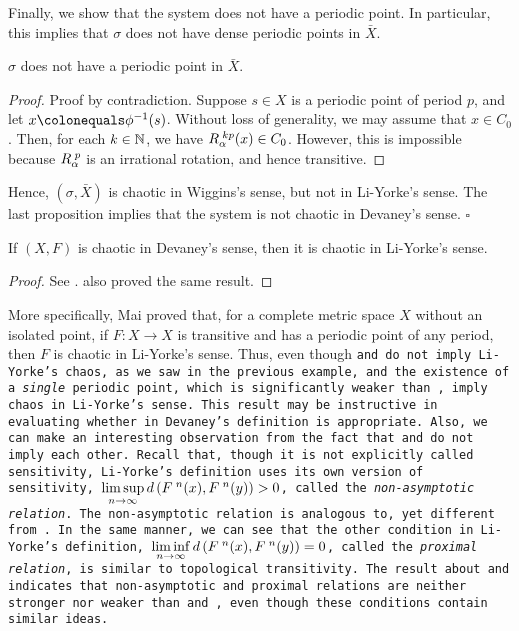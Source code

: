\documentclass[10pt,twoside,draft]{book}
\begin{document}
\begin{example}
  Finally, we show that the system does not have a periodic point.
  In particular, this implies that $\sigma$ does not have dense periodic points in $\bar{X}$.
  \begin{proposition}
    $\sigma$ does not have a periodic point in $\bar{X}$.
    \begin{proof}
      Proof by contradiction.
      Suppose $s \in X$ is a periodic point of period $p$, and let $x \ceq \phi^{-1}(s)$. 
      Without loss of generality, we may assume that $x \in C_0$.
      Then, for each $k \in \mathbb{N}$, we have $R_\alpha^{\;kp}(x) \in C_0$.
      However, this is impossible because $R_\alpha^{\;p}$ is an irrational rotation, and hence transitive.
    \end{proof}
  \end{proposition}
  Hence, $(\sigma, \bar{X})$ is chaotic in Wiggins's sense, but not in Li-Yorke's sense.
  The last proposition implies that the system is not chaotic in Devaney's sense.
  $\square$
\end{example}

\begin{theorem}
  If $(X, F)$ is chaotic in Devaney's sense, then it is chaotic in Li-Yorke's sense.
  \begin{proof}
    See \citet{mai}.
    \citet{huang} also proved the same result.
  \end{proof}
  \label{thm:dev-liy}
\end{theorem}
More specifically, Mai proved that, for a complete metric space $X$ without an isolated point, if $F: X \to X$ is transitive and has a periodic point of any period, then $F$ is chaotic in Li-Yorke's sense.
Thus, even though \tt and \sdic do not imply Li-Yorke's chaos, as we saw in the previous example, \tt and the existence of a \textit{single} periodic point, which is significantly weaker than \dpp, imply chaos in Li-Yorke's sense.
This result may be instructive in evaluating whether \dpp in Devaney's definition is appropriate.
Also, we can make an interesting observation from the fact that \wig and \liy do not imply each other. 
Recall that, though it is not explicitly called sensitivity, Li-Yorke's definition uses its own version of sensitivity, $\limsup\limits_{n\to \infty} d\left( F^{\;n}(x), F^{\;n}(y) \right) > 0$, called the \textit{non-asymptotic relation}.
The non-asymptotic relation is analogous to, yet different from \sdic.
In the same manner, we can see that the other condition in Li-Yorke's definition, $\liminf\limits_{n\to \infty} d\left( F^{\;n}(x), F^{\;n}(y) \right) = 0$, called the \textit{proximal relation}, is similar to topological transitivity.
The result about \wig and \liy indicates that non-asymptotic and proximal relations are neither stronger nor weaker than \tt and \sdic, even though these conditions contain similar ideas.
\end{document}
